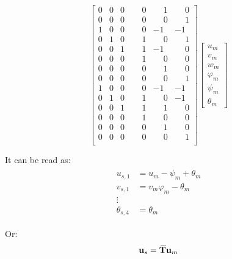 \documentclass[10pt,b5paper,titlepage]{book}
\newcommand{\m}{\mathbf}
\newcommand{\closure}[2][3]{%
{}\mkern#1mu\overline{\mkern-#1mu#2}}
\newenvironment{eqarray}
{
    \begin{eqnarray}
        \begin{aligned}
}
{
        \end{aligned}
    \end{eqnarray}
}
\begin{document}
\begin{equation}
\begin{bmatrix}
        0 & 0 & 0 & \phantom{-}0 & \phantom{-}1 & \phantom{-}0 \\
        0 & 0 & 0 & \phantom{-}0 & \phantom{-}0 & \phantom{-}1 \\
        1 & 0 & 0 & \phantom{-}0 & -1 & -1 \\
        0 & 1 & 0 & \phantom{-}1 & \phantom{-}0 & \phantom{-}1 \\
        0 & 0 & 1 & \phantom{-}1 & -1 & \phantom{-}0 \\
        0 & 0 & 0 & \phantom{-}1 & \phantom{-}0 & \phantom{-}0 \\
        0 & 0 & 0 & \phantom{-}0 & \phantom{-}1 & \phantom{-}0 \\
        0 & 0 & 0 & \phantom{-}0 & \phantom{-}0 & \phantom{-}1 \\
        1 & 0 & 0 & \phantom{-}0 & -1 & -1 \\
        0 & 1 & 0 & \phantom{-}1 & \phantom{-}0 & -1 \\
        0 & 0 & 1 & \phantom{-}1 & \phantom{-}1 & \phantom{-}0 \\
        0 & 0 & 0 & \phantom{-}1 & \phantom{-}0 & \phantom{-}0 \\
        0 & 0 & 0 & \phantom{-}0 & \phantom{-}1 & \phantom{-}0 \\
        0 & 0 & 0 & \phantom{-}0 & \phantom{-}0 & \phantom{-}1 \\
    \end{bmatrix}
    \begin{bmatrix}
        u_m \\
        v_m \\
        w_m \\
        \varphi_m \\
        \psi_m \\
        \theta_m
    \end{bmatrix}
\end{equation}

It can be read as:
\begin{eqarray}
    u_{s,1} &= u_m -\psi_m + \theta_m \\
    v_{s,1} &= v_m \varphi_m - \theta_m \\
    \vdots \\
    \theta_{s,4} &= \theta_m
\end{eqarray}

Or:
\begin{equation}\label{rbe2-coefficients}
    \m{u}_s = \m{\closure{T}} \m{u}_m
\end{equation}
\end{document}
